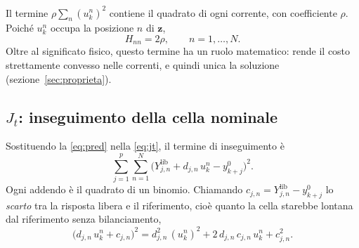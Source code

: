 \documentclass[11pt,a4paper]{article}
\newcommand{\vett}[1]{\boldsymbol{#1}}      %
\newcommand{\lib}{\mathrm{lib}}             %
\begin{document}
Il termine $\rho \sum_n (u^n_k)^2$ contiene il quadrato di ogni corrente, con
coefficiente $\rho$. Poiché $u^n_k$ occupa la posizione $n$ di $\vett{z}$,
\begin{equation}
  H_{nn} = 2\rho , \qquad n = 1,\dots,N .
  \label{eq:peso-u}
\end{equation}
Oltre al significato fisico, questo termine ha un ruolo matematico: rende il
costo strettamente convesso nelle correnti, e quindi unica la soluzione
(sezione~\ref{sec:proprieta}).

\subsection{$J_t$: inseguimento della cella nominale}\label{sec:jt}

Sostituendo la \eqref{eq:pred} nella \eqref{eq:jt}, il termine di inseguimento
è
\[
  \sum_{j=1}^{p}\sum_{n=1}^{N} \bigl(Y^\lib_{j,n} + d_{j,n}\,u^n_k - y^0_{k+j}\bigr)^2 .
\]
Ogni addendo è il quadrato di un binomio. Chiamando
$c_{j,n} = Y^\lib_{j,n} - y^0_{k+j}$ lo \emph{scarto} tra la risposta libera e il
riferimento, cioè quanto la cella starebbe lontana dal riferimento senza
bilanciamento,
\[
  \bigl(d_{j,n}\,u^n_k + c_{j,n}\bigr)^2
  = d_{j,n}^2\,(u^n_k)^2 + 2\,d_{j,n}\,c_{j,n}\,u^n_k + c_{j,n}^2 .
\]
\end{document}
